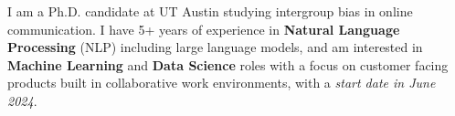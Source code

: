 I am a Ph.D. candidate at UT Austin studying intergroup bias in online communication. I have 5+ years of experience in \textbf{Natural Language Processing} (NLP) including large language models, and am interested in  \textbf{Machine Learning} and \textbf{Data Science} roles with a focus on customer facing products built in collaborative work environments, with a \emph{start date in June 2024}.

